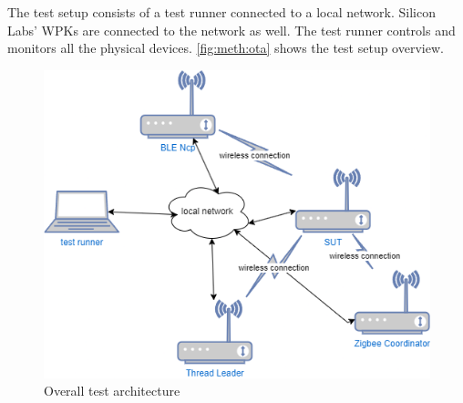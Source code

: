 The test setup consists of a test runner connected to a local network. Silicon Labs' WPKs are connected to the network as well. The test runner controls and monitors all the physical devices. \autoref{fig:meth:ota} shows the test setup overview.

\begin{figure}
    \centering
    \includegraphics[width=120mm, keepaspectratio]{figures/test_setup.png}
    \caption{Overall test architecture}
    \label{fig:meth:ota}
\end{figure}